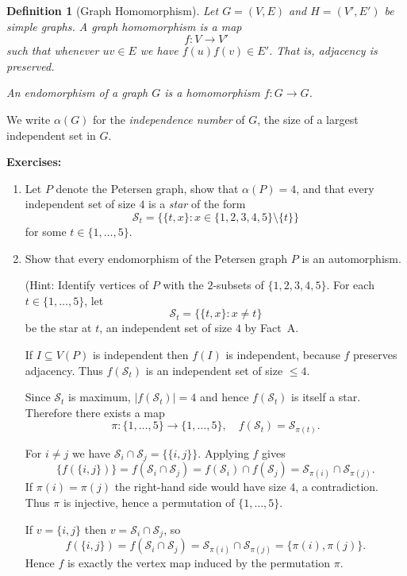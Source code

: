 \documentclass[12pt,a4paper,openany]{book}
\newtheorem{definition}{Definition}[section]
\begin{document}
\begin{definition}[Graph Homomorphism]
Let $G=(V,E)$ and $H=(V',E')$ be simple graphs.  
A \emph{graph homomorphism} is a map
\[
f:V \to V'
\]
such that whenever $uv \in E$ we have $f(u)f(v) \in E'$.  
That is, adjacency is preserved.

An \emph{endomorphism} of a graph $G$ is a homomorphism $f:G \to G$.  
\end{definition}

We write $\alpha(G)$ for the \emph{independence number} of $G$, the size of a largest independent set in $G$.

\textbf{Exercises:}
\begin{enumerate}
\item Let $P$ denote the Petersen graph, show that $\alpha(P) = 4$, and that every independent set of size $4$ is a \emph{star} of the form
\[
\mathcal{S}_t = \big\{ \{t,x\} : x \in \{1,2,3,4,5\} \setminus \{t\} \big\}
\]
for some $t \in \{1,\dots,5\}$.  



\item Show that every endomorphism of the Petersen graph $P$ is an automorphism.


(Hint:
Identify vertices of $P$ with the $2$-subsets of $\{1,2,3,4,5\}$.  
For each $t \in \{1,\dots,5\}$, let
\[
\mathcal{S}_t = \big\{ \{t,x\} : x \neq t \big\}
\]
be the star at $t$, an independent set of size $4$ by Fact~A.

 
If $I \subseteq V(P)$ is independent then $f(I)$ is independent, because $f$ preserves adjacency.  
Thus $f(\mathcal{S}_t)$ is an independent set of size $\le 4$.

Since $\mathcal{S}_t$ is maximum, $|f(\mathcal{S}_t)| = 4$ and hence $f(\mathcal{S}_t)$ is itself a star.  
Therefore there exists a map
\[
\pi : \{1,\dots,5\} \longrightarrow \{1,\dots,5\}, \quad f(\mathcal{S}_t) = \mathcal{S}_{\pi(t)}.
\]

For $i \neq j$ we have $\mathcal{S}_i \cap \mathcal{S}_j = \{\{i,j\}\}$.  
Applying $f$ gives
\[
\{f(\{i,j\})\} 
= f(\mathcal{S}_i \cap \mathcal{S}_j) 
= f(\mathcal{S}_i) \cap f(\mathcal{S}_j) 
= \mathcal{S}_{\pi(i)} \cap \mathcal{S}_{\pi(j)}.
\]
If $\pi(i) = \pi(j)$ the right-hand side would have size $4$, a contradiction.  
Thus $\pi$ is injective, hence a permutation of $\{1,\dots,5\}$.

If $v = \{i,j\}$ then $v = \mathcal{S}_i \cap \mathcal{S}_j$, so
\[
f(\{i,j\}) 
= f(\mathcal{S}_i \cap \mathcal{S}_j) 
= \mathcal{S}_{\pi(i)} \cap \mathcal{S}_{\pi(j)} 
= \{\pi(i),\pi(j)\}.
\]
Hence $f$ is exactly the vertex map induced by the permutation $\pi$.


\end{enumerate}
\end{document}
